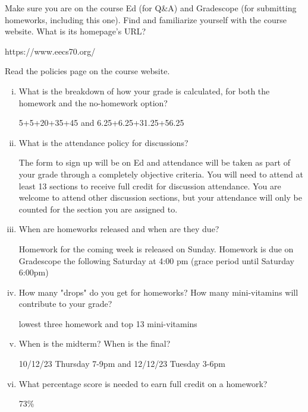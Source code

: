 \documentclass[11pt]{article}
\begin{document}
\begin{Parts}

\Part Make sure you are on the course Ed (for Q\&A) and Gradescope (for submitting homeworks, including this one). Find and familiarize yourself with the course website. What is its homepage's URL?

\begin{solution}
    https://www.eecs70.org/
\end{solution}

\Part Read the policies page on the course website.
	\begin{enumerate}[(i)]  
		\item What is the breakdown of how your grade is calculated, for both the homework and the no-homework option?\\
		\begin{solution}
            5+5+20+35+45 and 6.25+6.25+31.25+56.25
        \end{solution}
        \item What is the attendance policy for discussions?
        \\\begin{solution}
            The form to sign up will be on Ed and attendance will be taken as part of your grade through a completely objective criteria. You will need to attend at least 13 sections to receive full credit for discussion attendance. You are welcome to attend other discussion sections, but your attendance will only be counted for the section you are assigned to.
        \end{solution}
		\item When are homeworks released and when are they due?
		\\\begin{solution}
            Homework for the coming week is released on Sunday. Homework is due on Gradescope the following Saturday at 4:00 pm (grace period until Saturday 6:00pm)
        \end{solution}
		\item How many "drops" do you get for homeworks? How many mini-vitamins will contribute to your grade?
		\\\begin{solution}
            lowest three homework and top 13 mini-vitamins    
        \end{solution}
        \item When is the midterm? When is the final?
        \\\begin{solution}
            10/12/23 Thursday 7-9pm and 12/12/23 Tuesday 3-6pm    
        \end{solution}
        \item What percentage score is needed to earn full credit on a homework?
        \\\begin{solution}
            73\%
        \end{solution}
    \end{enumerate}

\end{Parts}
\end{document}
